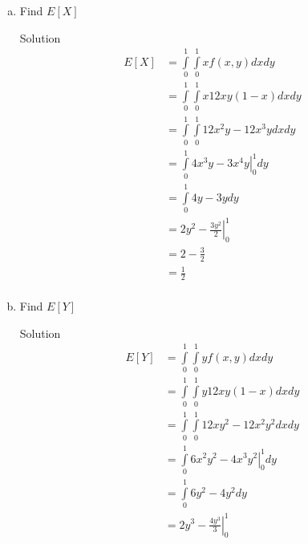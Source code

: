 \documentclass{article}
\begin{document}
\begin{spacing}{1.1}
\begin{homeworkProblem}
\begin{enumerate}[(a)]
\begin{homeworkSection}{Solution}
\begin{align*}
          &= \int\limits_0^b \int\limits_0^1 12 x y - 12 x^2 y dx dy\\
          &= \int\limits_0^b \left.6 x^2 y - 4 x^3 y\right|_0^1 dy\\
          &= \int\limits_0^b 6 y - 4 y dy\\
          &= \left.3 y^2 - 2 y^2\right|_0^1\\
          &= 3 b^2 - 2 b^2\\
        \end{align*}
        Since
        \[3 a^2 b^2 - 2 a^3 b^2 \neq (3 a^2 - 2 a^3) (3 b^2 - 2 b^2)\]
       $X$ and $Y$ are \emph{not} independent.
      \end{homeworkSection}
    \item Find $E[ X]$
      \begin{homeworkSection}{Solution}
        \begin{align*}
          E[ X] &= \int\limits_0^1 \int\limits_0^1 x f( x, y) dx dy\\
          &= \int\limits_0^1 \int\limits_0^1 x 12 x y (1 - x) dx dy\\
          &= \int\limits_0^1 \int\limits_0^1 12 x^2 y - 12 x^3 y dx dy\\
          &= \int\limits_0^1 \left.4 x^3 y - 3 x^4 y\right|_0^1 dy\\
          &= \int\limits_0^1 4 y  - 3 y dy\\
          &= \left.2 y^2 - \frac{3 y^2}{ 2}\right|_0^1\\
          &= 2 - \frac{3}{ 2}\\
          &= \frac{1}{ 2}\\
        \end{align*}
      \end{homeworkSection}
    \item Find $E[ Y]$
      \begin{homeworkSection}{Solution}
        \begin{align*}
          E[ Y] &= \int\limits_0^1 \int\limits_0^1 y f( x, y) dx dy\\
          &= \int\limits_0^1 \int\limits_0^1 y 12 x y (1 - x) dx dy\\
          &= \int\limits_0^1 \int\limits_0^1 12 x y^2 - 12 x^2 y^2 dx dy\\
          &= \int\limits_0^1 \left.6 x^2 y^2 - 4 x^3 y^2\right|_0^1 dy\\
          &= \int\limits_0^1 6 y^2 - 4 y^2 dy\\
          &= \left. 2 y^3 - \frac{ 4 y^3}{ 3}\right|_0^1\\

\end{align*}
\end{homeworkSection}
\end{enumerate}
\end{homeworkProblem}
\end{spacing}
\end{document}
